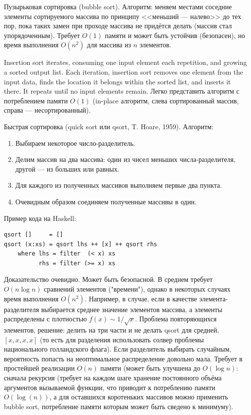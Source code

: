 \documentclass{book}
\begin{document}
Пузырьковая сортировка (bubble sort). Алгоритм: меняем местами соседние элементы
сортируемого массива по принципу <<меньший --- налево>> до тех пор, пока таких
замен при проходе массива не придётся делать (массив стал упорядоченным).
Требует $O(1)$ памяти и может быть устойчив (безопасен), но время выполнения
$O(n^2)$ для массива из $n$ элементов.

Insertion sort iterates, consuming one input element each repetition, and growing a sorted output
list. Each iteration, insertion sort removes one element from the input data, finds the location
it belongs within the sorted list, and inserts it there. It repeats until no input elements
remain. Легко представить алгоритм с потреблением памяти $O(1)$ (in-place алгоритм, слева
сортированный массив, справа --- несортированный).

Быстрая сортировка (quick sort или qsort, T. Hoare, 1959). Алгоритм:
\begin{enumerate}
  \item Выбираем некоторое число-разделитель.
  \item Делим массив на два массива: один из чисел меньших числа-разделителя,
    другой --- из больших или равных.
  \item Для каждого из полученных массивов выполняем первые два пункта.
  \item Очевидным образом соединяем полученные массивы в один.
\end{enumerate}
Пример кода на Haskell:
\begin{verbatim}
qsort []     = []
qsort (x:xs) = qsort lhs ++ [x] ++ qsort rhs
    where lhs = filter  (< x) xs
          rhs = filter (>= x) xs
\end{verbatim}
Доказательство очевидно. Может быть безопасной. В среднем требует $O(n\log n)$ сравнений элементов
("времени"), однако в некоторых случаях время выполнения $O(n^2)$. Например, в случае, если в
качестве элемента-разделителя выбирается среднее значение элементов массива, а элементы
распределены с плотностью $f(x) \sim 1 / \sqrt{x}$. Проблема повторяющихся элементов, решение: делить на три
части и не делать qsort для средней, $[x,x,x,x]$ (то есть для разделения использовать солвер
проблемы национального голландского флага). Если разделитель выбирать случайным, вероятность
попасть на неоптимальное распределение довольно мала.
Требует в простейшей реализации $O(n)$ памяти (может быть улучшена до
$O(\log n)$: сначала рекурсия (требует на каждом шаге хранение постоянного объёма аргументов
вызываемой функции, что приводит к потреблению памяти $O(\log(n))$, а для оставшихся коротеньких
массивов можно применить bubble sort, потребление памяти которым может быть сведено к минимуму).
\end{document}
